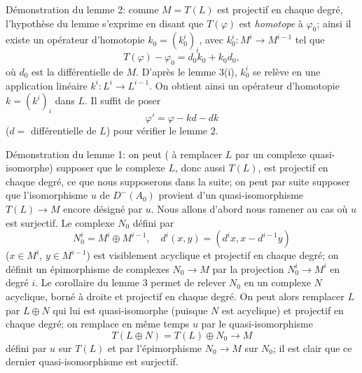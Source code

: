 Démonstration du lemme 2: comme $M=T(L)$ est projectif en chaque degré, l'hypothèse du lemme s'exprime en disant que $T(\varphi)$ est \emph{homotope} à $\varphi_0$; ainsi il existe un opérateur d'homotopie $k_0=(k_0^i)_i$, avec $k_0^i:M^i\to M^{i-1}$ tel que
\[
T(\varphi)-\varphi_0=d_0k_0+k_0d_0,
\]
où $d_0$ est la différentielle de $M$. D'après le lemme 3(i), $k_0^i$ se relève en une application linéaire $k^i:L^i\to L^{i-1}$. On obtient ainsi un opérateur d'homotopie $k=(k^i)_i$ dans $L$. Il suffit de poser
\[
\varphi'=\varphi-kd-dk
\]
($d=$ différentielle de $L$) pour vérifier le lemme 2.

Démonstration du lemme 1: on peut ( à remplacer $L$ par un complexe quasi-isomorphe) supposer que le complexe $L$, donc aussi $T(L)$, 
est
projectif en chaque degré, ce que nous supposerons dans la suite; on peut par suite supposer que l'isomorphisme $u$ de $D^-(A_0)$ provient d'un quasi-isomorphisme $T(L)\to M$ encore désigné par $u$. Nous allons d'abord nous ramener au cas où $u$ est surjectif. Le complexe $N_0$ défini par
\[
N_0^i=M^i\oplus M^{i-1},
\quad
 d^i(x,y)=(d^i x,x-d^{i-1}y)
\]
($x\in M^i$, $y\in M^{i-1}$) est visiblement acyclique et projectif en chaque degré; on définit un épimorphisme de complexes $N_0\to M$ par la projection $N_0^i\to M^i$ en degré $i$. Le corollaire du lemme 3 permet de relever $N_0$ en un complexe $N$ acyclique, borné à droite et projectif en chaque degré. On peut alors remplacer $L$ par $L\oplus N$ qui lui est quasi-isomorphe (puisque $N$ est acyclique) et projectif en chaque degré; on remplace en même temps $u$ par le quasi-isomorphisme
\[
T(L\oplus N)=T(L)\oplus N_0\longrightarrow M
\]
défini par $u$ sur $T(L)$ et par l'épimorphisme $N_0\to M$ sur $N_0$; il est clair que ce dernier quasi-isomorphisme est surjectif.

